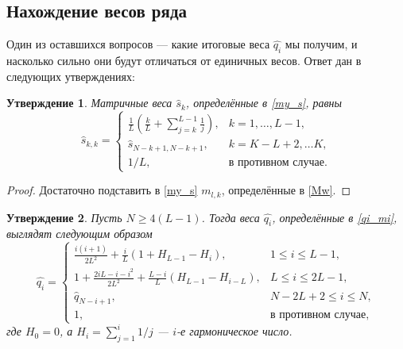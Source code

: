 \documentclass[12pt,a4paper,fleqn,leqno]{article}
\begin{document}
\subsection{Нахождение весов ряда}
Один из оставшихся вопросов --- какие итоговые веса $\hat{q_i}$ мы получим, и насколько сильно они будут отличаться от единичных весов. Ответ дан в следующих утверждениях:
\newtheorem{statement}{Утверждение}
\begin{statement} \label{myweightstat}
Матричные веса $\hat s_k$, определённые в \eqref{my_s}, равны
\begin{equation*}
\hat s_{k,k} = \begin{cases}
\frac{1}{L}\left(\frac{k}{L} + \sum_{j=k}^{L-1} \frac{1}{j} \right),& k = 1, \ldots, L-1, \\
\hat s_{N - k + 1, N - k + 1}, & k = K - L + 2, \ldots K, \\
1/L, &\text{в противном случае}.
\end{cases}
\end{equation*}
\end{statement}
\begin{proof}
Достаточно подставить в \eqref{my_s} $m_{l,k}$, определённые в \eqref{Mw}.
\end{proof}
\begin{statement} \label{myserweightstat}
Пусть $N \ge 4(L-1)$. Тогда веса $\hat{q_i}$, определённые в \eqref{qi_mi},
выглядят следующим образом
\begin{equation*}
\hat{q_i} = \begin{cases}
\frac{i(i+1)}{2 L^2} + \frac{i}{L}(1 + H_{L-1} - H_i), &1 \le i \le L-1, \\
1 + \frac{2iL-i-i^2}{2L^2} + \frac{L-i}{L}(H_{L-1} - H_{i - L}), & L \le i \le 2L-1, \\
\hat{q}_{N-i+1}, &N-2L+2 \le i \le N, \\
1, &\text{в противном случае},
\end{cases}
\end{equation*}
где $H_0 = 0$, а $H_i = \sum_{j=1}^i 1/j$ --- $i$-е гармоническое число.
\end{statement}
\end{document}
